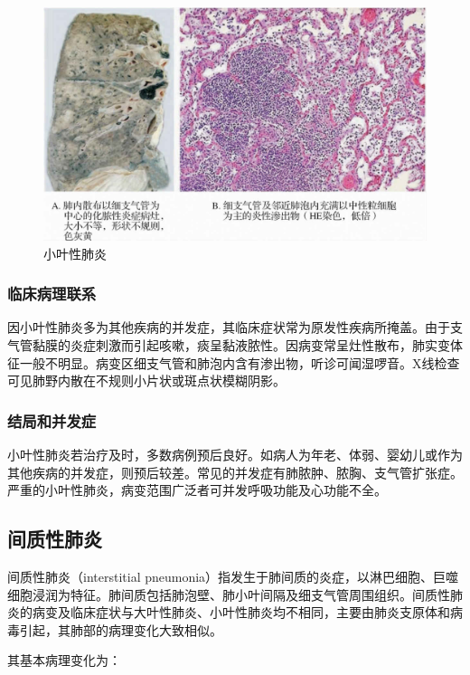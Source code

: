 \begin{figure}[!htbp]
 \centering
 \includegraphics{./images/Image00120.jpg}
 \captionsetup{justification=centering}
 \caption{小叶性肺炎}
 \label{fig7-11}
  \end{figure} 

\subsubsection{临床病理联系}

因小叶性肺炎多为其他疾病的并发症，其临床症状常为原发性疾病所掩盖。由于支气管黏膜的炎症刺激而引起咳嗽，痰呈黏液脓性。因病变常呈灶性散布，肺实变体征一般不明显。病变区细支气管和肺泡内含有渗出物，听诊可闻湿啰音。X线检查可见肺野内散在不规则小片状或斑点状模糊阴影。

\subsubsection{结局和并发症}

小叶性肺炎若治疗及时，多数病例预后良好。如病人为年老、体弱、婴幼儿或作为其他疾病的并发症，则预后较差。常见的并发症有肺脓肿、脓胸、支气管扩张症。严重的小叶性肺炎，病变范围广泛者可并发呼吸功能及心功能不全。

\subsection{间质性肺炎}

间质性肺炎（interstitial
pneumonia）指发生于肺间质的炎症，以淋巴细胞、巨噬细胞浸润为特征。肺间质包括肺泡壁、肺小叶间隔及细支气管周围组织。间质性肺炎的病变及临床症状与大叶性肺炎、小叶性肺炎均不相同，主要由肺炎支原体和病毒引起，其肺部的病理变化大致相似。

其基本病理变化为：

